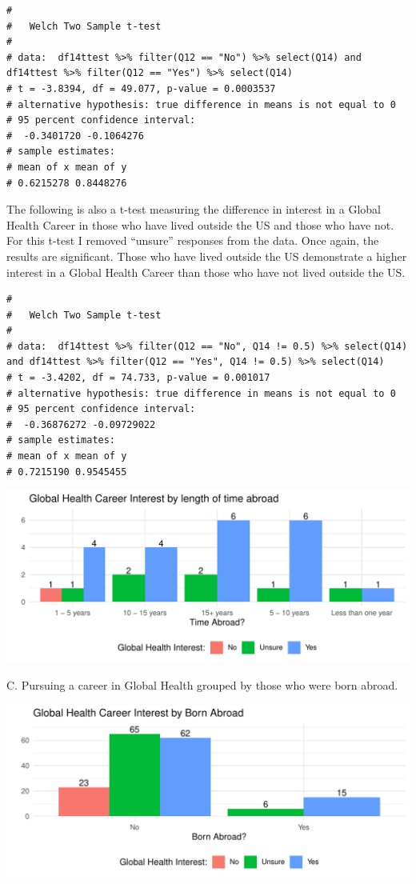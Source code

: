 \documentclass[
  letterpaper,
  DIV=11,
  numbers=noendperiod]{scrartcl}
\begin{document}
\begin{verbatim}
# 
#   Welch Two Sample t-test
# 
# data:  df14ttest %>% filter(Q12 == "No") %>% select(Q14) and df14ttest %>% filter(Q12 == "Yes") %>% select(Q14)
# t = -3.8394, df = 49.077, p-value = 0.0003537
# alternative hypothesis: true difference in means is not equal to 0
# 95 percent confidence interval:
#  -0.3401720 -0.1064276
# sample estimates:
# mean of x mean of y 
# 0.6215278 0.8448276
\end{verbatim}

The following is also a t-test measuring the difference in interest in a
Global Health Career in those who have lived outside the US and those
who have not. For this t-test I removed ``unsure'' responses from the
data. Once again, the results are significant. Those who have lived
outside the US demonstrate a higher interest in a Global Health Career
than those who have not lived outside the US.

\begin{verbatim}
# 
#   Welch Two Sample t-test
# 
# data:  df14ttest %>% filter(Q12 == "No", Q14 != 0.5) %>% select(Q14) and df14ttest %>% filter(Q12 == "Yes", Q14 != 0.5) %>% select(Q14)
# t = -3.4202, df = 74.733, p-value = 0.001017
# alternative hypothesis: true difference in means is not equal to 0
# 95 percent confidence interval:
#  -0.36876272 -0.09729022
# sample estimates:
# mean of x mean of y 
# 0.7215190 0.9545455
\end{verbatim}

\newpage

\includegraphics{GlobalHealthQuarto1-5_files/figure-pdf/unnamed-chunk-16-1.pdf}

\newpage

C. Pursuing a career in Global Health grouped by those who were born
abroad.

\includegraphics{GlobalHealthQuarto1-5_files/figure-pdf/unnamed-chunk-17-1.pdf}
\end{document}

